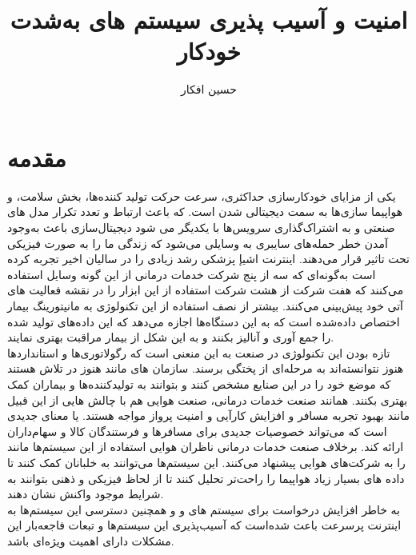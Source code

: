 \documentclass[a4paper, 11pt]{article}
\title{امنیت و آسیب پذیری سیستم های به‌شدت خودکار}
\author{حسین افکار}
\begin{document}
\maketitle

\section{مقدمه}
یکی از مزایای خودکارسازی حداکثری، سرعت حرکت تولید کننده‌ها، بخش سلامت، و هواپیما سازی‌ها به 
سمت دیجیتالی شدن است.
که باعث ارتباط و تعدد تکرار مدل های صنعتی و به اشتراک‌گذاری سرویس‌ها با یکدیگر می شود
دیجیتال‌سازی باعث به‌وجود آمدن خطر حمله‌های سایبری به وسایلی می‌شود که زندگی ما را به صورت
فیزیکی تحت تاثیر قرار می‌دهند. اینترنت اشیإ پزشکی رشد زیادی را در سالیان اخیر تجربه کرده است
به‌گونه‌ای که سه از پنج شرکت خدمات درمانی از این گونه وسایل استفاده می‌کنند که هفت شرکت
از هشت شرکت استفاده از این ابزار را در نقشه فعالیت های آتی خود پیش‌بینی می‌کنند.
بیشتر از نصف استفاده از این تکنولوژی به مانیتورینگ بیمار اختصاص داده‌‌شده است که به این دستگاه‌ها
اجازه می‌دهد که این داده‌های تولید شده را جمع آوری و آنالیز بکنند و به این شکل از بیمار مراقبت
بهتری نمایند. \\
تازه بودن این تکنولوژی در صنعت به این منعنی است که رگولاتوری‌ها و استاندارد‌ها هنوز نتوانسته‌اند به 
مرحله‌ای از پختگی برسند. سازمان های مانند
هنوز در تلاش هستند که موضع خود را در این صنایع مشخص کنند و بتوانند به تولید‌کننده‌ها و بیماران
کمک بهتری بکنند.
همانند صنعت خدمات درمانی، صنعت هوایی هم با چالش هایی از این قبیل مانند بهبود تجربه مسافر و
افزایش کارآیی و امنیت پرواز مواجه هستند.
یا
معنای جدیدی است که می‌تواند خصوصیات جدیدی برای مسافر‌ها و فرستندگان کالا و سهام‌داران ارائه کند.
برخلاف صنعت خدمات درمانی ناظران هوایی استفاده از این سیستم‌ها مانند
را به شرکت‌های هوایی پیشنهاد می‌کنند.
این سیستم‌ها می‌توانند به خلبانان کمک کنند تا داده های بسیار زیاد هواپیما را راحت‌تر تحلیل کنند تا
از لحاظ فیزیکی و ذهنی بتوانند به شرایط موجود واکنش نشان دهند. \\
به خاطر افزایش درخواست برای سیستم های
و
و همچنین دسترسی این سیستم‌ها به اینترنت پرسرعت باعث شده‌است که آسیب‌پذیری این سیستم‌ها و تبعات
فاجعه‌بار این مشکلات دارای اهمیت ویژه‌ای باشد.
\end{document}
